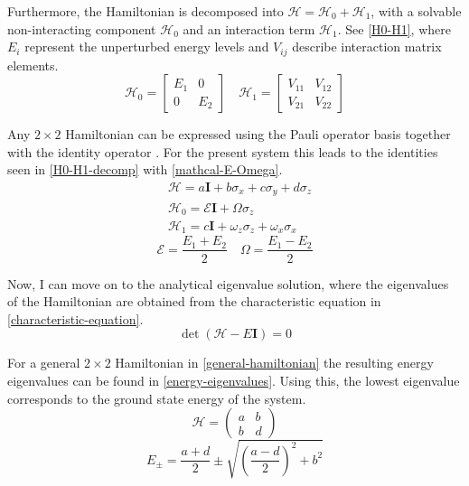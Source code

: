 Furthermore, the Hamiltonian is decomposed into $\mathcal{H}=\mathcal{H}_0+\mathcal{H}_1$, with a solvable non-interacting component $\mathcal{H}_0$ and an interaction term $\mathcal{H}_1$. See \cref{H0-H1}, where $E_i$ represent the unperturbed energy levels and $V_{ij}$ describe interaction matrix elements.
\begin{equation}\label{H0-H1}
    \mathcal{H}_0=\begin{bmatrix}
        E_1 & 0 \\
        0 & E_2
    \end{bmatrix}\quad
    \mathcal{H}_1=\begin{bmatrix}
        V_{11} & V_{12} \\
        V_{21} & V_{22}
    \end{bmatrix}
\end{equation} 

Any $2\times2$ Hamiltonian can be expressed using the Pauli operator basis together with the identity operator \parencite{scherer2019mathqc}. For the present system this leads to the identities seen in \cref{H0-H1-decomp} with \cref{mathcal-E-Omega}. 
\begin{equation}\label{H0-H1-decomp}
\begin{aligned}
    &\mathcal{H}=a\textbf{I}+b\sigma_x+c\sigma_y+d\sigma_z\\
    &\mathcal{H}_0 = \mathcal{E}\textbf{I} + \Omega\sigma_z \\
    &\mathcal{H}_1 = c\textbf{I} + \omega_z\sigma_z + \omega_x\sigma_x
\end{aligned}
\end{equation}
\begin{equation}\label{mathcal-E-Omega}
    \mathcal{E}=\frac{E_1+E_2}{2} \quad \Omega=\frac{E_1-E_2}{2}
\end{equation}

Now, I can move on to the analytical eigenvalue solution, where the eigenvalues of the Hamiltonian are obtained from the characteristic equation in \cref{characteristic-equation}.
\begin{equation}\label{characteristic-equation}
    \det(\mathcal{H}-E\textbf{I})=0
\end{equation}

For a general $2\times2$ Hamiltonian in \cref{general-hamiltonian} the resulting energy eigenvalues can be found in \cref{energy-eigenvalues}. Using this, the lowest eigenvalue corresponds to the ground state energy of the system.
\begin{equation}\label{general-hamiltonian}
    \mathcal{H}=\begin{pmatrix}
        a&b\\b&d
    \end{pmatrix}
\end{equation}
\begin{equation}\label{energy-eigenvalues}
    E_{\pm} = \frac{a+d}{2}\pm\sqrt{\left(\frac{a-d}{2}\right)^2+b^2}
\end{equation} 

